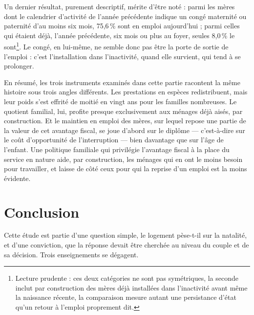 \documentclass[12pt,a4paper]{article}
\begin{document}
\noindent Un dernier résultat, purement descriptif, mérite d'être noté : parmi les mères dont le calendrier d'activité de l'année précédente indique un congé maternité ou paternité d'au moins six mois, 75,6\,\% sont en emploi aujourd'hui ; parmi celles qui étaient déjà, l'année précédente, six mois ou plus au foyer, seules 8,0\,\% le sont\footnote{Lecture prudente : ces deux catégories ne sont pas symétriques, la seconde inclut par construction des mères déjà installées dans l'inactivité avant même la naissance récente, la comparaison mesure autant une persistance d'état qu'un retour à l'emploi proprement dit.}. Le congé, en lui-même, ne semble donc pas être la porte de sortie de l'emploi : c'est l'installation dans l'inactivité, quand elle survient, qui tend à se prolonger.

\bigskip

\noindent En résumé, les trois instruments examinés dans cette partie racontent la même histoire sous trois angles différents. Les prestations en espèces redistribuent, mais leur poids s'est effrité de moitié en vingt ans pour les familles nombreuses. Le quotient familial, lui, profite presque exclusivement aux ménages déjà aisés, par construction. Et le maintien en emploi des mères, sur lequel repose une partie de la valeur de cet avantage fiscal, se joue d'abord sur le diplôme — c'est-à-dire sur le coût d'opportunité de l'interruption — bien davantage que sur l'âge de l'enfant. Une politique familiale qui privilégie l'avantage fiscal à la place du service en nature aide, par construction, les ménages qui en ont le moins besoin pour travailler, et laisse de côté ceux pour qui la reprise d'un emploi est la moins évidente.
	
	\section{Conclusion}
	
	Cette étude est partie d'une question simple, le logement pèse-t-il sur la natalité, et d'une conviction, que la réponse devait être cherchée au niveau du couple et de sa décision. Trois enseignements se dégagent. \\
\end{document}
